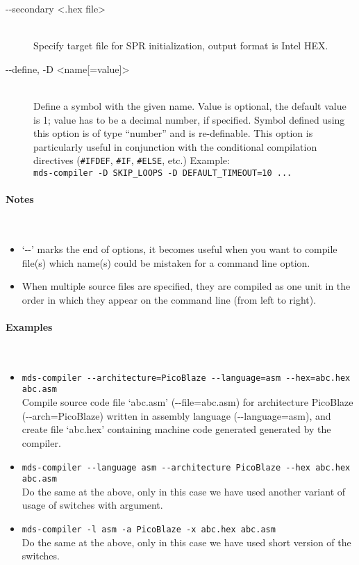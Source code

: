\begin{description}
            \item[-{}-secondary <.hex file>]~\\
                Specify target file for SPR initialization, output format is Intel HEX.

            \item[-{}-define, -D <name{[}=value{]}>]~\\
                Define a symbol with the given name. Value is optional, the default value is 1; value has to be a decimal number, if specified. Symbol defined using this option is of type ``number'' and is re-definable. This option is particularly useful in conjunction with the conditional compilation directives (\texttt{\#IFDEF}, \texttt{\#IF}, \texttt{\#ELSE}, etc.) Example:~\\
                \verb'mds-compiler -D SKIP_LOOPS -D DEFAULT_TIMEOUT=10 ...'

        \end{description}

    \paragraph{Notes}~\\
        \begin{itemize}
            \item `-{}-' marks the end of options, it becomes useful when you want to compile file(s) which name(s) could be mistaken for a command line option.
            \item When multiple source files are specified, they are compiled as one unit in the order in which they appear on the command line (from left to right).
        \end{itemize}

    \paragraph{Examples}~\\
        \begin{itemize}
            \item \verb'mds-compiler --architecture=PicoBlaze --language=asm --hex=abc.hex abc.asm'\\
                Compile source code file `abc.asm' (-{}-file=abc.asm) for architecture PicoBlaze (-{}-arch=PicoBlaze) written in assembly language (-{}-language=asm), and create file `abc.hex' containing machine code generated generated by the compiler.

            \item \verb'mds-compiler --language asm --architecture PicoBlaze --hex abc.hex abc.asm'\\
                Do the same at the above, only in this case we have used another variant of usage of switches with argument.

            \item \verb'mds-compiler -l asm -a PicoBlaze -x abc.hex abc.asm'\\
                Do the same at the above, only in this case we have used short version of the switches.
        \end{itemize}

